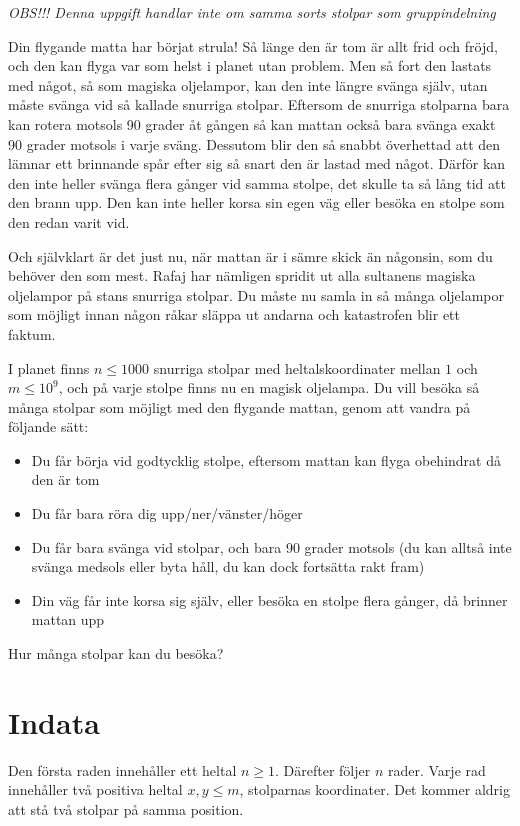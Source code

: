 \textit{OBS!!! Denna uppgift handlar inte om samma sorts stolpar som gruppindelning}

Din flygande matta har börjat strula! Så länge den är tom är allt frid och fröjd, och den kan
flyga var som helst i planet utan problem. Men så fort den lastats med något, så som magiska oljelampor,
kan den inte längre svänga själv, utan måste svänga vid så kallade snurriga stolpar. Eftersom
de snurriga stolparna bara kan rotera motsols 90 grader åt gången så kan mattan också bara svänga exakt
90 grader motsols i varje sväng. Dessutom blir den så snabbt överhettad att den lämnar ett brinnande
spår efter sig så snart den är lastad med något. Därför kan den inte heller svänga flera gånger vid
samma stolpe, det skulle ta så lång tid att den brann upp. Den kan inte heller korsa sin egen väg eller
besöka en stolpe som den redan varit vid.

Och självklart är det just nu, när mattan är i sämre skick än någonsin, som du behöver den som mest.
Rafaj har nämligen spridit ut alla sultanens magiska oljelampor på stans snurriga stolpar.
Du måste nu samla in så många oljelampor som möjligt innan någon råkar släppa ut andarna och
katastrofen blir ett faktum.

I planet finns $n \leq 1000$ snurriga stolpar med heltalskoordinater mellan $1$ och $m \leq 10^9$,
och på varje stolpe finns nu en magisk oljelampa. Du vill besöka så många stolpar som möjligt med den
flygande mattan, genom att vandra på följande sätt:
\begin{itemize}
  \item Du får börja vid godtycklig stolpe, eftersom mattan kan flyga obehindrat då den är tom
  \item Du får bara röra dig upp/ner/vänster/höger
  \item Du får bara svänga vid stolpar, och bara 90 grader motsols (du kan alltså inte svänga medsols eller byta håll, du kan dock fortsätta rakt fram)
  \item Din väg får inte korsa sig själv, eller besöka en stolpe flera gånger, då brinner mattan upp
\end{itemize}
Hur många stolpar kan du besöka?

\section*{Indata}
Den första raden innehåller ett heltal $n \ge 1$.
Därefter följer $n$ rader. Varje rad innehåller två positiva heltal $x,y \leq m$, stolparnas koordinater.
Det kommer aldrig att stå två stolpar på samma position.

